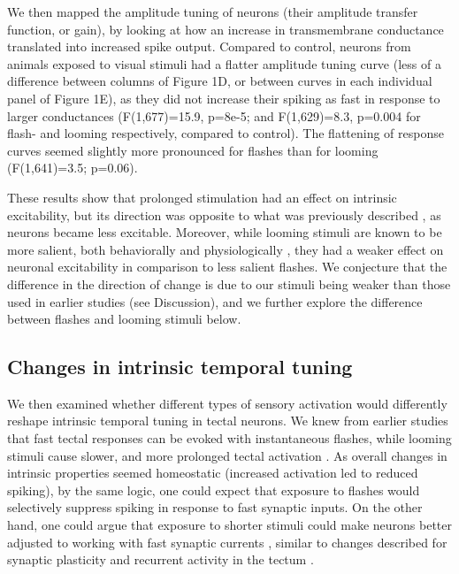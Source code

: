 \documentclass{article}
\begin{document}
We then mapped the amplitude tuning of neurons (their amplitude transfer function, or gain), by looking at how an increase in transmembrane conductance translated into increased spike output. Compared to control, neurons from animals exposed to visual stimuli had a flatter amplitude tuning curve (less of a difference between columns of Figure 1D, or between curves in each individual panel of Figure 1E), as they did not increase their spiking as fast in response to larger conductances (F(1,677)=15.9, p=8e-5; and F(1,629)=8.3, p=0.004 for flash- and looming respectively, compared to control). The flattening of response curves seemed slightly more pronounced for flashes than for looming (F(1,641)=3.5; p=0.06). 

These results show that prolonged stimulation had an effect on intrinsic excitability, but its direction was opposite to what was previously described \citep{aizenman2003,ciarleglio2015}, as neurons became less excitable. Moreover, while looming stimuli are known to be more salient, both behaviorally and physiologically \citep{khakhalin2014}, they had a weaker effect on neuronal excitability in comparison to less salient flashes. We conjecture that the difference in the direction of change is due to our stimuli being weaker than those used in earlier studies (see Discussion), and we further explore the difference between flashes and looming stimuli below.

\subsection*{Changes in intrinsic temporal tuning}

We then examined whether different types of sensory activation would differently reshape intrinsic temporal tuning in tectal neurons. We knew from earlier studies that fast tectal responses can be evoked with instantaneous flashes, while looming stimuli cause slower, and more prolonged tectal activation \citep{khakhalin2014, khakhalin2019graph}. As overall changes in intrinsic properties seemed homeostatic (increased activation led to reduced spiking), by the same logic, one could expect that exposure to flashes would selectively suppress spiking in response to fast synaptic inputs. On the other hand, one could argue that exposure to shorter stimuli could make neurons better adjusted to working with fast synaptic currents \citep{stemmler1999information}, similar to changes described for synaptic plasticity \citep{aizenman2007} and recurrent activity in the tectum \citep{pratt2007, shen2011}.
\end{document}
